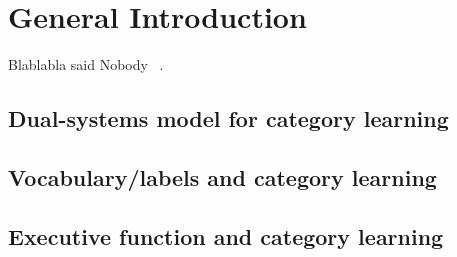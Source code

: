 \documentclass[../dissertation.tex]{subfiles}
\begin{document}
\section{General Introduction}

Blablabla said Nobody ~\cite{Lund1996}.

\subsection{Dual-systems model for category learning}
 
\subsection{Vocabulary/labels and category learning}

\subsection{Executive function and category learning}
\end{document}
